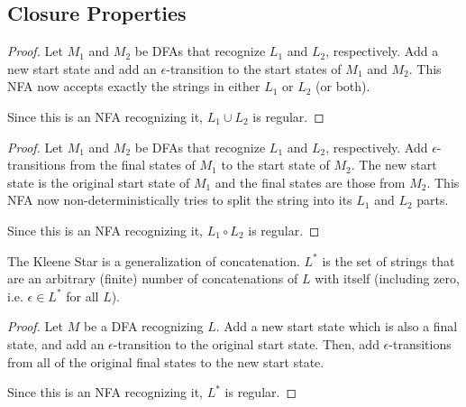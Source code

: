 \subsection*{Closure Properties}


\begin{proof}
	
	Let $M_1$ and $M_2$ be DFAs that recognize $L_1$ and $L_2$, respectively.  Add a new start state and add an $\epsilon$-transition to the start states of $M_1$ and $M_2$.  This NFA now accepts exactly the strings in either $L_1$ or $L_2$ (or both).
	
	Since this is an NFA recognizing it, 	$L_1\cup L_2$ is regular.
	
	
\end{proof}


\begin{proof}
	
		Let $M_1$ and $M_2$ be DFAs that recognize $L_1$ and $L_2$, respectively.  Add $\epsilon$-transitions from the final states of $M_1$ to the start state of $M_2$.  The new start state is the original start state of $M_1$ and the final states are those from $M_2$.  This NFA now non-deterministically tries to split the string into its $L_1$ and $L_2$ parts.
		
	Since this is an NFA recognizing it, 	$L_1\circ L_2$ is regular.
	
	
\end{proof}


The Kleene Star is a generalization of concatenation.  $L^*$ is the set of strings that are an arbitrary (finite) number of concatenations of $L$ with itself (including zero, i.e. $\epsilon\in L^*$ for all $L$).

\begin{proof}
	
	Let $M$ be a DFA recognizing $L$.  Add a new start state which is also a final state, and add an $\epsilon$-transition to the original start state.  Then, add $\epsilon$-transitions from all of the original final states to the new start state.
	
		Since this is an NFA recognizing it, 	$L^*$ is regular.
	
\end{proof}

